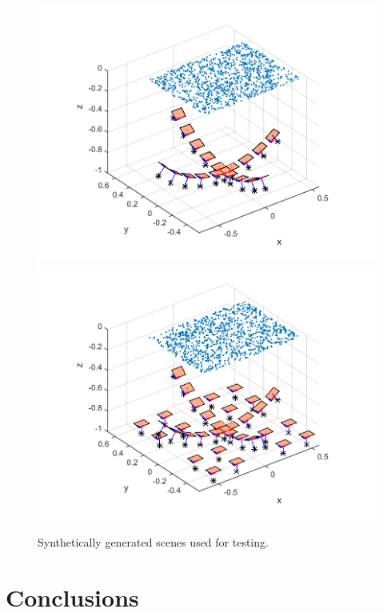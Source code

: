 \documentclass[10pt,twocolumn,letterpaper]{article}
\begin{document}
\begin{figure}
\centering
\includegraphics[width=0.45\linewidth]{images/synthCameraPosesRotation.pdf}
\includegraphics[width=0.45\linewidth]{images/synthCameraPosesTranslation.pdf}
\caption{Synthetically generated scenes used for testing.}
\label{fig:synth_poses}
\end{figure}

\section{Conclusions}

{\small


}
\end{document}
